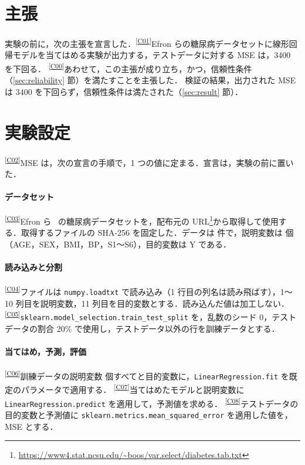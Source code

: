 \documentclass[9pt,a4paper,twocolumn]{ltjsarticle}
\newcommand{\schemaurl}{https://github.com/auto-res2/formal-first-diabetes-regression-4/blob/\SchemaCommit/formal/claims.json}
\newcommand{\cid}[1]{\textsuperscript{\textsf{\scriptsize[\href{\schemaurl\#L\csname line#1\endcsname}{#1}]}}}
\newcommand{\code}[1]{\texttt{\small #1}}
\begin{document}

\section{主張}

実験の前に，次の主張を宣言した．\cid{C01}Efron らの糖尿病データセットに線形回帰モデルを当てはめる実験が出力する，テストデータに対する MSE は，3400 を下回る．
\cid{C00}あわせて，この主張が成り立ち，かつ，信頼性条件（\ref{sec:reliability} 節）を満たすことを主張した．
検証の結果，出力された MSE は 3400 を下回らず，信頼性条件は満たされた（\ref{sec:result} 節）．

\section{実験設定}

\cid{C02}MSE は，次の宣言の手順で，1 つの値に定まる．宣言は，実験の前に置いた．

\paragraph{データセット}
\cid{C03}Efron ら~\cite{efron} の糖尿病データセットを，配布元の URL\footnote{\url{https://www4.stat.ncsu.edu/~boos/var.select/diabetes.tab.txt}}から取得して使用する．取得するファイルの SHA-256 を固定した．データは \NSamples{} 件で，説明変数は \NFeatures{} 個（AGE，SEX，BMI，BP，S1〜S6），目的変数は Y である．

\paragraph{読み込みと分割}
\cid{C04}ファイルは \code{numpy.loadtxt} で読み込み（1 行目の列名は読み飛ばす），1〜10 列目を説明変数，11 列目を目的変数とする．読み込んだ値は加工しない．
\cid{C05}\code{sklearn.model\_selection.train\_test\_split} を，乱数のシード 0，テストデータの割合 20\% で使用し，テストデータ以外の行を訓練データとする．

\paragraph{当てはめ，予測，評価}
\cid{C06}訓練データの説明変数 \NFeatures{} 個すべてと目的変数に，\code{LinearRegression.fit} を既定のパラメータで適用する．
\cid{C07}当てはめたモデルと説明変数に \code{LinearRegression.predict} を適用して，予測値を求める．
\cid{C08}テストデータの目的変数と予測値に \code{sklearn.metrics.mean\_squared\_error} を適用した値を，MSE とする．
\end{document}
